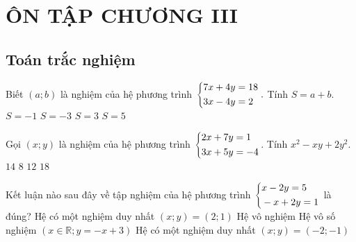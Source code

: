 \section{ÔN TẬP CHƯƠNG III}
\subsection{Toán trắc nghiệm}
\begin{bt}%
	Biết $ (a;b) $ là nghiệm của hệ phương trình $ \left\{\begin{aligned}&7x+4y=18\\&3x-4y=2\end{aligned}\right.. $ Tính $ S=a+b. $
	\choice
	{$ S=-1 $}
	{$ S=-3 $}
	{\True $ S = 3 $}
	{$ S = 5 $}
\end{bt}
\begin{bt}%
	Gọi $ (x;y) $	là nghiệm của hệ phương trình $ \left\{\begin{aligned}&2x+7y=1\\&3x+5y=-4\end{aligned}\right. $. Tính $ x^2 - xy + 2y^2. $
	\choice
	{\True $ 14 $}
	{$ 8 $}
	{$ 12 $}
	{$ 18 $}
\end{bt}
\begin{bt}%
	Kết luận nào sau đây về tập nghiệm của hệ phương trình $\left\{\begin{aligned}& x-2y=5 \\ 
		& -x+2y=1\end{aligned}\right.$
	là đúng?
	\choice
	{Hệ có một nghiệm duy nhất $ ( x ; y ) = ( 2 ; 1 )$}
	{\True Hệ vô nghiệm}
	{Hệ vô số nghiệm  $( x  \in \mathbb{R};  y = - x + 3)$}
	{Hệ có một nghiệm duy nhất $ ( x ; y ) = ( -2 ; -1 ) $}
\end{bt}
